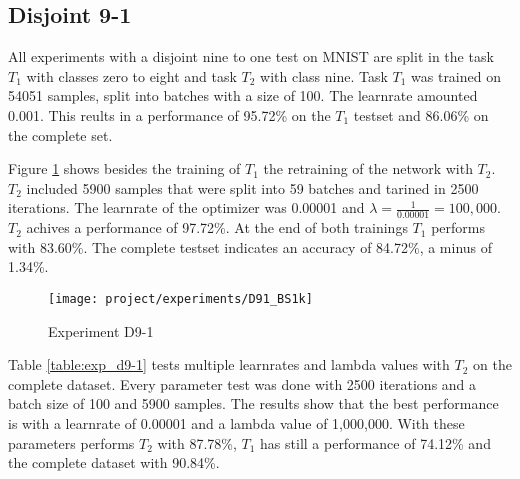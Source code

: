 \subsection{Disjoint 9-1}

All experiments with a disjoint nine to one test on MNIST are split in the task $T_1$ with classes zero to eight and task $T_2$ with class nine.
Task $T_1$ was trained on 54051 samples, split into batches with a size of 100.
The learnrate amounted 0.001.
This reults in a performance of 95.72\% on the $T_1$ testset and 86.06\% on the complete set.

Figure \ref{fig:exp_d9-1_bs1k} shows besides the training of $T_1$ the retraining of the network with $T_2$.
$T_2$ included 5900 samples that were split into 59 batches and tarined in 2500 iterations.
The learnrate of the optimizer was 0.00001 and $\lambda = \frac{1}{0.00001} = 100,000$.
$T_2$ achives a performance of 97.72\%.
At the end of both trainings $T_1$ performs with 83.60\%.
The complete testset indicates an accuracy of 84.72\%, a minus of 1.34\%.

\begin{figure}[H]
    \centering
    \texttt{[image: project/experiments/D91\_BS1k]}
    \caption{Experiment D9-1}
    \label{fig:exp_d9-1_bs1k}
\end{figure}

\newpage

Table \ref{table:exp_d9-1} tests multiple learnrates and lambda values with $T_2$ on the complete dataset.
Every parameter test was done with 2500 iterations and a batch size of 100 and 5900 samples.
\newline
The results show that the best performance is with a learnrate of 0.00001 and a lambda value of 1,000,000. With these parameters performs $T_2$ with 87.78\%, $T_1$ has still a performance of 74.12\% and the complete dataset with 90.84\%.

